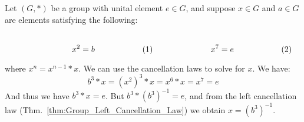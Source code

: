     \begin{example}
        Let $(G,*)$ be a group with unital element $e\in{G}$, and suppose
        $x\in{G}$ and $a\in{G}$ are elements satisfying the following:
        \par
        \begin{subequations}
            \begin{minipage}[b]{0.49\textwidth}
                \centering
                \begin{equation}
                    x^{2}=b
                \end{equation}
            \end{minipage}
            \hfill
            \begin{minipage}[b]{0.49\textwidth}
                \begin{equation}
                    x^{7}=e
                \end{equation}
            \end{minipage}
        \end{subequations}
        \par\vspace{2.5ex}
        where $x^{n}=x^{n-1}*x$. We can use the cancellation laws to solve for
        $x$. We have:
        \begin{equation}
            b^{3}*x=(x^{2})^{3}*x=x^{6}*x=x^{7}=e
        \end{equation}
        And thus we have $b^{3}*x=e$. But $b^{3}*(b^{3})^{\minus{1}}=e$, and
        from the left cancellation law
        (Thm.~\ref{thm:Group_Left_Cancellation_Law}) we obtain
        $x=(b^{3})^{\minus{1}}$.
    \end{example}
